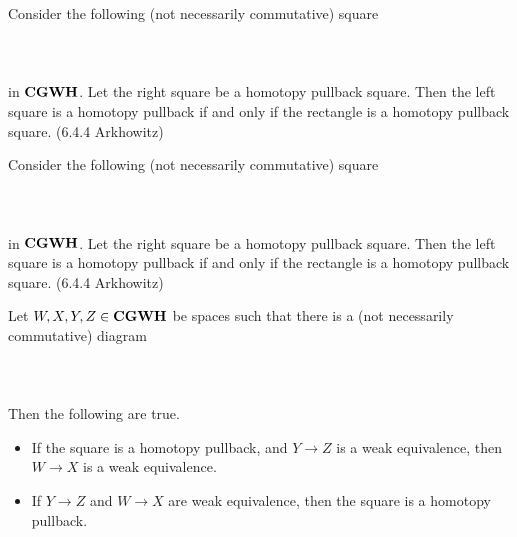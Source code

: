 \documentclass[a4paper]{article}
\begin{document}
\begin{prp}{}{} Consider the following (not necessarily commutative) square \\~\\
\\~\\
in $\bold{CGWH}$. Let the right square be a homotopy pullback square. Then the left square is a homotopy pullback if and only if the rectangle is a homotopy pullback square. (6.4.4 Arkhowitz)
\end{prp}

\begin{prp}{}{} Consider the following (not necessarily commutative) square \\~\\
\\~\\
in $\bold{CGWH}$. Let the right square be a homotopy pullback square. Then the left square is a homotopy pullback if and only if the rectangle is a homotopy pullback square. (6.4.4 Arkhowitz)
\end{prp}

\begin{prp}{}{} Let $W,X,Y,Z\in\bold{CGWH}$ be spaces such that there is a (not necessarily commutative) diagram \\~\\
\\~\\
Then the following are true. 
\begin{itemize}
\item If the square is a homotopy pullback, and $Y\to Z$ is a weak equivalence, then $W\to X$ is a weak equivalence. 
\item If $Y\to Z$ and $W\to X$ are weak equivalence, then the square is a homotopy pullback. 
\end{itemize}
\end{prp}
\end{document}
